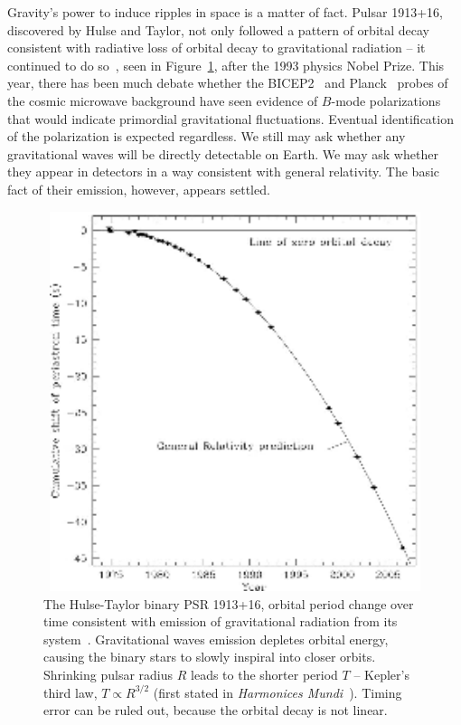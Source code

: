 		Gravity's power to induce ripples in space is a matter of fact. Pulsar 1913+16, discovered by Hulse and Taylor, not only followed a pattern of orbital decay consistent with radiative loss of orbital decay to gravitational radiation -- it continued to do so~\cite{WeisbergTaylor2004,Weisberg2010}, seen in Figure~\ref{Hulse-Taylor_binary}, after the 1993 physics Nobel Prize. 
This year, there has been much debate whether the BICEP2~\cite{BICEP2014} and Planck~\cite{Planck2014} probes of the cosmic microwave background have seen evidence of $B$-mode polarizations that would indicate primordial gravitational fluctuations.
Eventual identification of the polarization is expected regardless. 
We still may ask whether any gravitational waves will be directly detectable on Earth. 
We may ask whether they appear in detectors in a way consistent with general relativity. 
The basic fact of their emission, however, appears settled.

	\begin{figure}
	\begin{center}
	\includegraphics[height=111mm, width=148mm]{500px-PSR_B1913+16_period_shift_graph.eps}
	\caption{The Hulse-Taylor binary PSR 1913+16, orbital period change over time consistent with emission of gravitational radiation from its system~\cite{Weisberg2010}. Gravitational waves emission depletes orbital energy, causing the binary stars to slowly inspiral into closer orbits. Shrinking pulsar radius $R$ leads to the shorter period $T$ -- Kepler's third law, $T \propto R^{3/2}$ (first stated in \textit{Harmonices Mundi}~\cite{Hawking2002}). Timing error can be ruled out, because the orbital decay is not linear.}
	\label{Hulse-Taylor_binary}
	\end{center}
	\end{figure}

